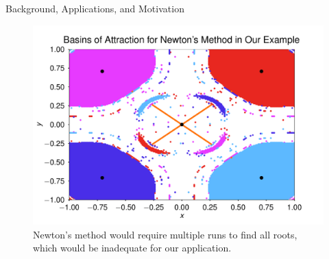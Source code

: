 \documentclass[final]{beamer}
\begin{document}
\begin{frame}{}
\begin{columns}[t]
\begin{column}{.31\linewidth}
\begin{block}{Background, Applications, and Motivation}
\begin{figure}[H]
\begin{center}
\begin{minipage}{.55\textwidth}
\end{minipage}%
\begin{minipage}{.45\textwidth}
\includegraphics[width=\textwidth]{newton_basins.pdf}
\end{minipage}%
\end{center}
\caption{Newton's method would require multiple runs to find all roots, which would be inadequate for our application.}
\end{figure}
\end{block}


\end{column}
\end{columns}
\end{frame}
\end{document}
